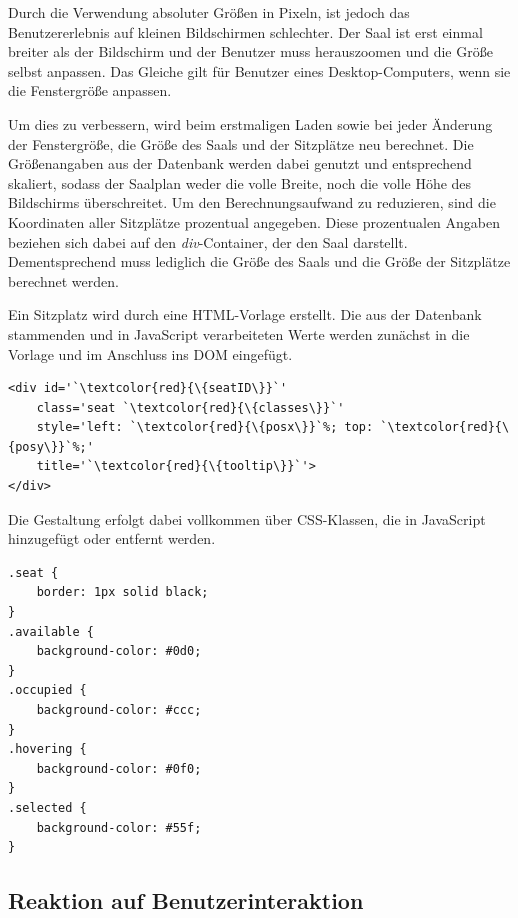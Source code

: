 Durch die Verwendung absoluter Größen in Pixeln, ist jedoch das Benutzererlebnis auf kleinen Bildschirmen schlechter.
Der Saal ist erst einmal breiter als der Bildschirm und der Benutzer muss herauszoomen und die Größe selbst anpassen.
Das Gleiche gilt für Benutzer eines Desktop-Computers, wenn sie die Fenstergröße anpassen.

Um dies zu verbessern, wird beim erstmaligen Laden sowie bei jeder Änderung der Fenstergröße, die Größe des Saals und der Sitzplätze neu berechnet.
Die Größenangaben aus der Datenbank werden dabei genutzt und entsprechend skaliert, sodass der Saalplan weder die volle Breite, noch die volle Höhe des Bildschirms überschreitet.
Um den Berechnungsaufwand zu reduzieren, sind die Koordinaten aller Sitzplätze prozentual angegeben.
Diese prozentualen Angaben beziehen sich dabei auf den \textit{div}-Container, der den Saal darstellt.
Dementsprechend muss lediglich die Größe des Saals und die Größe der Sitzplätze berechnet werden.

Ein Sitzplatz wird durch eine \acs{HTML}-Vorlage erstellt.
Die aus der Datenbank stammenden und in JavaScript verarbeiteten Werte werden zunächst in die Vorlage und im Anschluss ins \acs{DOM} eingefügt.

\begin{lstlisting}[style=lstHTML, caption={\acs{HTML}-Vorlage für die Darstellung eines Sitzplatzes}, label={lst:html_template_seat}]
<div id='`\textcolor{red}{\{seatID\}}`'
	class='seat `\textcolor{red}{\{classes\}}`'
	style='left: `\textcolor{red}{\{posx\}}`%; top: `\textcolor{red}{\{posy\}}`%;'
	title='`\textcolor{red}{\{tooltip\}}`'>
</div>
\end{lstlisting}

Die Gestaltung erfolgt dabei vollkommen über \acs{CSS}-Klassen, die in JavaScript hinzugefügt oder entfernt werden.

\begin{lstlisting}[style=lstCSS, caption={Optische Gestaltung der Sitzplätze}, label={lst:css_seat}]
.seat {
	border: 1px solid black;
}
.available {
	background-color: #0d0;
}
.occupied {
	background-color: #ccc;
}
.hovering {
	background-color: #0f0;
}
.selected {
	background-color: #55f;
}
\end{lstlisting}

\subsection{Reaktion auf Benutzerinteraktion}

